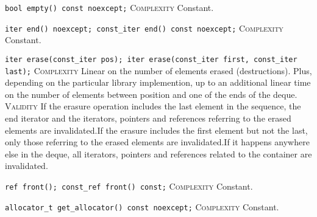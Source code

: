 \noindent{}\hspace*{0.25em}\lstinline[basicstyle=\ttfamily\color{cgreen}]{bool empty() const noexcept;} \textsc{Complexity} Constant.\\\vspace{-0.6em}

\noindent{}\hspace*{0.25em}\lstinline[basicstyle=\ttfamily\color{cgreen}]{iter end() noexcept; const_iter end() const noexcept;} \textsc{Complexity} Constant.\\\vspace{-0.6em}

\noindent{}\hspace*{0.25em}\lstinline[basicstyle=\ttfamily\color{corange}]{iter erase(const_iter pos); iter erase(const_iter first, const_iter last);} \textsc{Complexity} Linear on the number of elements erased (destructions). Plus, depending on the particular library implemention, up to an additional linear time on the number of elements between position and one of the ends of the deque. \textsc{Validity} If the erasure operation includes the last element in the sequence, the end iterator and the iterators, pointers and references referring to the erased elements are invalidated.If the erasure includes the first element but not the last, only those referring to the erased elements are invalidated.If it happens anywhere else in the deque, all iterators, pointers and references related to the container are invalidated.\\\vspace{-0.6em}

\noindent{}\hspace*{0.25em}\lstinline[basicstyle=\ttfamily\color{cgreen}]{ref front(); const_ref front() const;} \textsc{Complexity} Constant.\\\vspace{-0.6em}

\noindent{}\hspace*{0.25em}\lstinline[basicstyle=\ttfamily\color{cgreen}]{allocator_t get_allocator() const noexcept;} \textsc{Complexity} Constant.\\\vspace{-0.6em}

